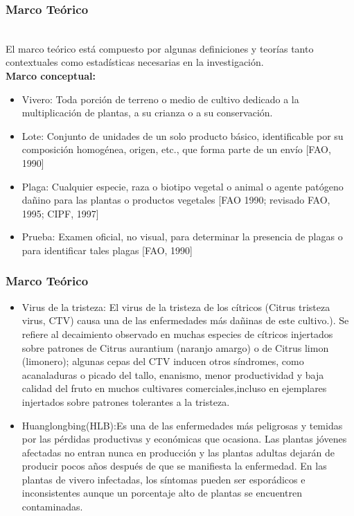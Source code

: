 \documentclass[11pt]{beamer}
\begin{document}
\begin{frame}
\frametitle{Marco Teórico}
~\\El marco teórico está compuesto por algunas definiciones y teorías tanto contextuales como estadísticas necesarias en la investigación.
~\\\textbf{Marco conceptual:}
\begin{itemize}
\item Vivero: Toda porción de terreno o medio de cultivo dedicado a la multiplicación de plantas, a su crianza o a su conservación.
\item Lote: Conjunto de unidades de un solo producto básico, identificable por su composición homogénea, origen, etc., que forma parte de un envío [FAO, 1990] 
\item Plaga: Cualquier especie, raza o biotipo vegetal o animal o agente patógeno dañino para las plantas o productos vegetales [FAO 1990; revisado FAO, 1995; CIPF, 1997] 
\item Prueba: Examen oficial, no visual, para determinar la presencia de plagas o para identificar tales plagas [FAO, 1990] 
\end{itemize}
\end{frame}

\begin{frame}
\frametitle{Marco Teórico}
\begin{itemize}
\item Virus de la tristeza: El virus de la tristeza de los cítricos (Citrus tristeza virus, CTV) causa una de las enfermedades más
dañinas de este cultivo.). Se refiere al decaimiento observado en muchas especies de cítricos injertados sobre patrones de Citrus aurantium (naranjo amargo) o de Citrus limon (limonero); algunas cepas del CTV inducen otros síndromes, como acanaladuras o picado del tallo, enanismo, menor productividad y baja calidad del fruto en muchos cultivares comerciales,incluso en ejemplares injertados sobre patrones tolerantes a la tristeza.
\item Huanglongbing(HLB):Es una de las enfermedades más peligrosas y temidas por las pérdidas productivas y económicas que ocasiona. Las plantas jóvenes afectadas no entran nunca en producción y las plantas adultas dejarán de producir pocos años después de que se manifiesta la enfermedad. En las plantas de vivero infectadas, los síntomas pueden ser esporádicos e inconsistentes aunque un porcentaje alto de plantas se encuentren contaminadas.
\end{itemize}
\end{frame}
\end{document}
